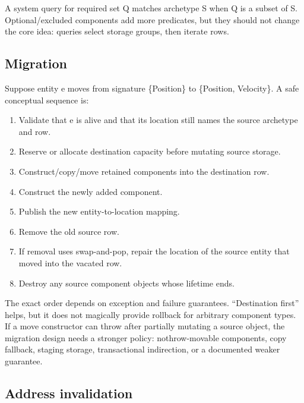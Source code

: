 A system query for required set Q matches archetype S when Q is a subset of S. Optional/excluded components add more predicates, but they should not change the core idea: queries select storage groups, then iterate rows.

\subsection{Migration}\label{appendix-fbfeb0430008-migration}

\hypertarget{appendix-fbfeb0430008-migration}{}

Suppose entity e moves from signature \{Position\} to \{Position, Velocity\}. A safe conceptual sequence is:

\begin{enumerate}
\def\labelenumi{\arabic{enumi}.}
\tightlist
\item
  Validate that e is alive and that its location still names the source archetype and row.
\item
  Reserve or allocate destination capacity before mutating source storage.
\item
  Construct/copy/move retained components into the destination row.
\item
  Construct the newly added component.
\item
  Publish the new entity-to-location mapping.
\item
  Remove the old source row.
\item
  If removal uses swap-and-pop, repair the location of the source entity that moved into the vacated row.
\item
  Destroy any source component objects whose lifetime ends.
\end{enumerate}

The exact order depends on exception and failure guarantees. ``Destination first'' helps, but it does not magically provide rollback for arbitrary component types. If a move constructor can throw after partially mutating a source object, the migration design needs a stronger policy: nothrow-movable components, copy fallback, staging storage, transactional indirection, or a documented weaker guarantee.

\subsection{Address invalidation}\label{appendix-fbfeb0430008-address-invalidation}

\hypertarget{appendix-fbfeb0430008-address-invalidation}{}

